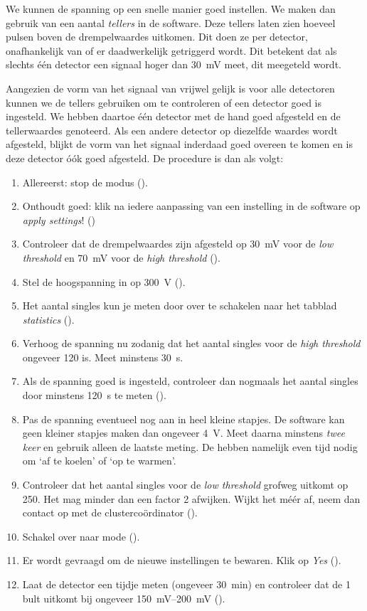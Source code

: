 We kunnen de spanning op een snelle manier goed instellen.  We maken dan
gebruik van een aantal \emph{tellers} in de \hisparc software.  Deze
tellers laten zien hoeveel pulsen boven de drempelwaardes uitkomen.  Dit
doen ze per detector, onafhankelijk van of er daadwerkelijk getriggerd
wordt.  Dit betekent dat als slechts één detector een signaal hoger dan
\SI{30}{\milli\volt} meet, dit meegeteld wordt.

Aangezien de vorm van het signaal van \hisparc vrijwel gelijk is voor alle
detectoren kunnen we de tellers gebruiken om te controleren of een
detector goed is ingesteld.  We hebben daartoe één \hisparc detector met
de hand goed afgesteld en de tellerwaardes genoteerd.  Als een andere
detector op diezelfde waardes wordt afgesteld, blijkt de vorm van het
signaal inderdaad goed overeen te komen en is deze detector óók goed
afgesteld.  De procedure is dan als volgt:

\begin{enumerate}
\item Allereerst: stop de \daq modus ().
\item Onthoudt goed: klik na iedere aanpassing van een instelling in de
software op \emph{apply settings}! ()
\item Controleer dat de drempelwaardes zijn afgesteld op
\SI{30}{\milli\volt} voor de \emph{low threshold} en \SI{70}{\milli\volt}
voor de \emph{high threshold} ().
\item Stel de hoogspanning in op \SI{300}{\volt} ().
\item Het aantal singles kun je meten door over te schakelen naar het
tabblad \emph{statistics} ().
\item Verhoog de spanning nu zodanig dat het aantal singles voor de
\emph{high threshold} ongeveer 120 is.  Meet minstens \SI{30}{\second}.
\item Als de spanning goed is ingesteld, controleer dan nogmaals het
aantal singles door minstens \SI{120}{\second} te meten
().
\item Pas de spanning eventueel nog aan in heel kleine stapjes.  De
software kan geen kleiner stapjes maken dan ongeveer \SI{4}{\volt}.  Meet
daarna minstens \emph{twee keer} en gebruik alleen de laatste meting.  De
\pmts hebben namelijk even tijd nodig om `af te koelen' of `op te warmen'.
\item Controleer dat het aantal singles voor de \emph{low threshold}
grofweg uitkomt op 250.  Het mag minder dan een factor 2 afwijken.  Wijkt
het méér af, neem dan contact op met de \hisparc clustercoördinator
().
\item Schakel over naar \daq mode ().
\item Er wordt gevraagd om de nieuwe instellingen te bewaren.  Klik op
\emph{Yes} ().
\item Laat de detector een tijdje meten (ongeveer \SI{30}{\minute}) en
controleer dat de \SI{1}{\mip} bult uitkomt bij ongeveer
\SIrange{150}{200}{\milli\volt} ().
\end{enumerate}

